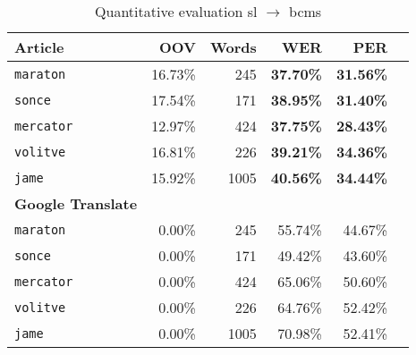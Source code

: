 \begin{table}
\begin{tabular}{lrrrrr}

\textbf{Article} & \textbf{OOV} & \textbf{Words} & \textbf{WER} & \textbf{PER}\\
\hline
\texttt{maraton} & 16.73\% & 245 & \textbf{37.70\%} & \textbf{31.56\%} \\ 
\texttt{sonce} & 17.54\% & 171 & \textbf{38.95\%} & \textbf{31.40\%} \\
\texttt{mercator} & 12.97\% & 424 & \textbf{37.75\%} & \textbf{28.43\%} \\
\texttt{volitve} & 16.81\% & 226 & \textbf{39.21\%} & \textbf{34.36\%}\\
\texttt{jame} & 15.92\% & 1005 & \textbf{40.56\%} & \textbf{34.44\%} \\
\hline
\textbf{Google Translate} & & & & \\
\hline
\texttt{maraton} & 0.00\% & 245 & 55.74\% & 44.67\% \\ 
\texttt{sonce} & 0.00\% & 171 & 49.42\% & 43.60\% \\
\texttt{mercator} & 0.00\% & 424 & 65.06\% & 50.60\% \\
\texttt{volitve} & 0.00\% & 226 & 64.76\% & 52.42\%\\
\texttt{jame} & 0.00\% & 1005 & 70.98\% & 52.41\% \\
\hline
\end{tabular}
\caption{ Quantitative evaluation sl $\rightarrow$ bcms}
\label{table:quantitative2}
\end{table}

